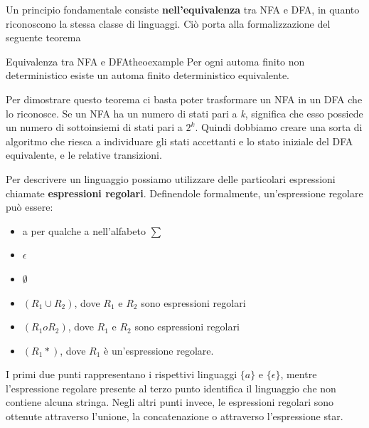 \documentclass[a4paper]{extarticle}
\begin{document}
Un principio fondamentale consiste \textbf{nell'equivalenza} tra NFA e DFA, in quanto riconoscono la stessa classe di linguaggi. Ciò porta alla formalizzazione del seguente teorema
\begin{teorema}{Equivalenza tra NFA e DFA}{theoexample}
Per ogni automa finito non deterministico esiste un automa finito deterministico equivalente.
\end{teorema}

Per dimostrare questo teorema ci basta poter trasformare un NFA in un DFA che lo riconosce. Se un NFA ha un numero di stati pari a \textit{k}, significa che esso possiede un numero di sottoinsiemi di stati pari a $2^k$. Quindi dobbiamo creare una sorta di algoritmo che riesca a individuare gli stati accettanti e lo stato iniziale del DFA equivalente, e le relative transizioni. 

Per descrivere un linguaggio possiamo utilizzare delle particolari espressioni chiamate \textbf{espressioni regolari}. Definendole formalmente, un'espressione regolare può essere:
\begin{itemize}
\item a per qualche a nell'alfabeto $\sum$
\item $\epsilon$
\item $\emptyset$
\item $(R_1 \cup R_2)$, dove $R_1$ e  $R_2$ sono espressioni regolari
\item $(R_1 o R_2)$, dove $R_1$ e $R_2$ sono espressioni regolari
\item $(R_1*)$, dove $R_1$ è un'espressione regolare.
\end{itemize}
I primi due punti rappresentano i rispettivi linguaggi $\{a\}$ e $\{\epsilon\}$, mentre l'espressione regolare presente al terzo punto identifica il linguaggio che non contiene alcuna stringa. Negli altri punti invece, le espressioni regolari sono ottenute attraverso l'unione, la concatenazione o attraverso l'espressione star.
\end{document}
